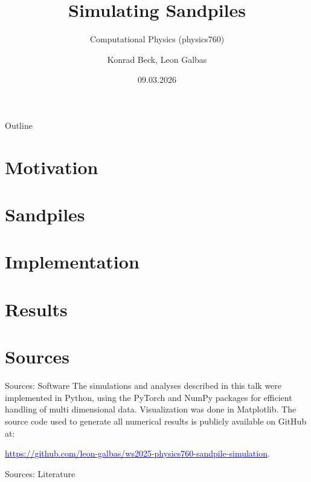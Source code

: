 \documentclass[10pt]{beamer}
\title[Simulating Sandpiles]{Simulating Sandpiles}
\subtitle{Computational Physics (physics760)}
\author{Konrad Beck, Leon Galbas}
\date{09.03.2026}
\institute[Universität Bonn]{Rheinische Friedrich-Wilhelms-Universität Bonn}
\begin{document}
\frame{\titlepage}

\begin{frame}{Outline}
    \tableofcontents
\end{frame}


\section{Motivation}



\section{Sandpiles}



\section{Implementation}



\section{Results}



\section*{Sources}
\begin{frame}{Sources: Software}
    The simulations and analyses described in this talk were implemented in Python, using the PyTorch and NumPy packages for efficient handling of multi dimensional data. Visualization was done in Matplotlib. The source code used to generate all numerical results is publicly available on GitHub at:

    \href{https://github.com/leon-galbas/ws2025-physics760-sandpile-simulation}{\textcolor{blue}{https://github.com/leon-galbas/ws2025-physics760-sandpile-simulation}}.
\end{frame}
\begin{frame}{Sources: Literature}
    \begin{tiny}
        \printbibliography
    \end{tiny}
\end{frame}
\end{document}
